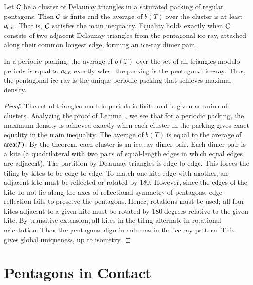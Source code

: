 \begin{theorem}
  Let $\mathcal C$ be a cluster of Delaunay triangles in a saturated packing
  of regular pentagons.  Then $\mathcal C$ is finite and the average of $b(T)$
  over the cluster is at least $a_\text{crit}$.  That is, $\mathcal C$ satisfies the
  main inequality.  Equality holds exactly when $\mathcal C$ consists of two
  adjacent Delaunay triangles from the pentagonal ice-ray, attached
  along their common longest edge, forming an ice-ray dimer pair.
\end{theorem}

\begin{corollary}\label{cor:equal}
  In a periodic packing, the average of $b(T)$ over the set of
  all triangles modulo periods is equal to $a_\text{crit}$ exactly when
  the packing is the pentagonal ice-ray.
  Thus, the pentagonal ice-ray  is the
unique periodic packing that achieves maximal density.
\end{corollary}

\begin{proof}
  The set of triangles modulo periods is finite and is given as union
  of clusters.  Analyzing the proof of Lemma~, we see
  that for a periodic packing, the maximum density is achieved exactly
  when each cluster in the packing gives exact equality in the main
  inequality.  The average of $b(T)$ is equal to the average of
  ${\operatorname{area}}(T)$.  By the theorem, each cluster is an ice-ray dimer pair.
  Each dimer pair is a kite (a quadrilateral with two pairs of equal-length
  edges in
  which equal edges are adjacent).  The partition by
  Delaunay triangles is edge-to-edge.  This forces the tiling by kites
  to be edge-to-edge.  To match one kite edge with another, an adjacent
  kite must be reflected or rotated by 180.  However, since the
  edges of the kite do not lie along the axes of reflectional symmetry of pentagons,
  edge reflection fails to preserve
  the pentagons.  Hence, rotations must be used;
  all four kites adjacent
  to a given kite must be rotated by 180 degrees relative to the given
  kite.  By transitive extension, all kites in the tiling alternate in
  rotational orientation.  Then the pentagons align in columns in the
  ice-ray pattern.  This gives global uniqueness, up to isometry.
\end{proof}

\section{Pentagons in Contact}

